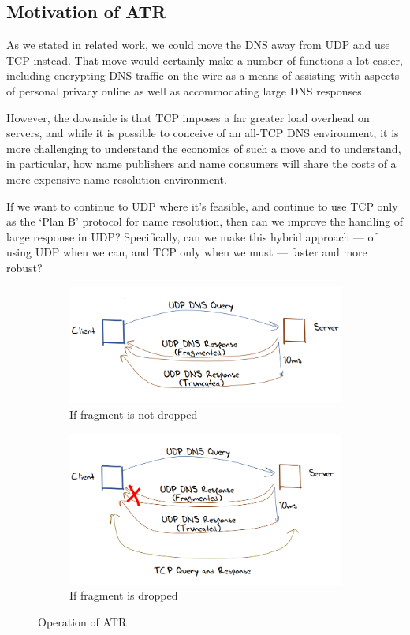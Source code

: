 \subsection{Motivation of ATR}

As we stated in related work, we could move the DNS away from 
UDP and use TCP instead. That move would certainly make a number 
of functions a lot easier, including encrypting DNS traffic on 
the wire as a means of assisting with aspects of personal 
privacy online as well as accommodating large DNS responses.

However, the downside is that TCP imposes a far greater load 
overhead on servers, and while it is possible to conceive of 
an all-TCP DNS environment, it is more challenging to understand 
the economics of such a move and to understand, in particular, 
how name publishers and name consumers will share the costs of a 
more expensive name resolution environment.

If we want to continue to UDP where it’s feasible, and continue 
to use TCP only as the ‘Plan B’ protocol for name resolution, 
then can we improve the handling of large response in UDP? 
Specifically, can we make this hybrid approach — of using 
UDP when we can, and TCP only when we must — faster and more robust?

\begin{figure}
\begin{subfigure}[b]{0.45\textwidth}
\includegraphics[width=\linewidth]{figures/ATR_a.png}
\caption{If fragment is not dropped} \label{fig:1a}
\end{subfigure}
\hspace*{\fill} %
\begin{subfigure}[b]{0.45\textwidth}
\includegraphics[width=\linewidth]{figures/ATR_b.png}
\caption{If fragment is dropped} \label{fig:1b}
\end{subfigure}
\caption{Operation of ATR} \label{fig:1}
\end{figure}


